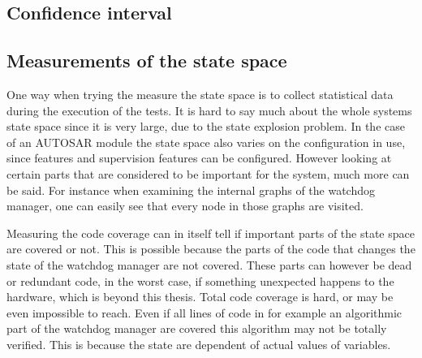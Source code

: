 \subsection{Confidence interval}




\subsection{Measurements of the state space}
One way when trying the measure the state space is to collect
statistical data during the execution of the tests. It is hard to say
much about the whole systems state space since it is very large, due
to the state explosion problem. In the case of an AUTOSAR module the
state space also varies on the configuration in use, since features
and supervision features can be configured.  However looking at
certain parts that are considered to be important for the system, much
more can be said. For instance when examining the internal graphs of
the watchdog manager, one can easily see that every node in those
graphs are visited.

Measuring the code coverage can in itself tell if important parts of
the state space are covered or not. This is possible because the parts
of the code that changes the state of the watchdog manager are not
covered. These parts can however be dead or redundant code, in the
worst case, if something unexpected happens to the hardware, which is
beyond this thesis. Total code coverage is hard, or may be even
impossible to reach.  Even if all lines of code in for example an
algorithmic part of the watchdog manager are covered this algorithm
may not be totally verified. This is because the state are dependent
of actual values of variables.
